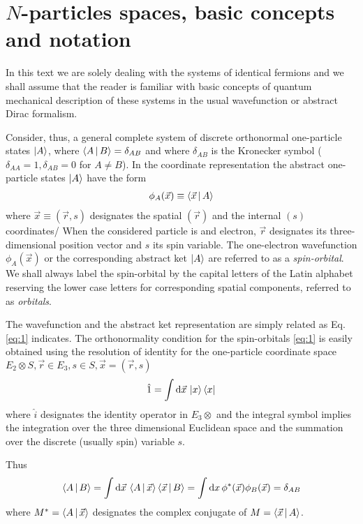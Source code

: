 \documentclass{book}
\renewcommand{\braket}[1]{\Braket{#1}}
\renewcommand{\ket}[1]{\Ket{#1}}
\renewcommand{\bra}[1]{\Bra{#1}}
\newcommand{\de}[1]{\mathrm{d}{#1}\,}
\begin{document}
\section{$N$-particles spaces, basic concepts and notation}
In this text we are solely dealing with the systems of identical fermions and we shall assume that the reader is familiar with basic concepts of quantum mechanical description of these systems in the usual wavefunction or abstract Dirac formalism.

Consider, thus, a general complete system of discrete orthonormal one-particle states $\ket{A}$, where $\braket{A|B}=\delta_{AB}$ and where $\delta_{AB}$ is the Kronecker symbol ($\delta_{AA}=1,\delta_{AB}=0$ for $A\neq B$). In the coordinate representation the abstract one-particle states $\ket{A}$ have the form 
\begin{align}
    \phi_A(\vec{x})\equiv \braket{\vec{x}|A}
    \label{eq:1}
\end{align} 
where $\vec{x}\equiv(\vec{r},s)$ designates the spatial $(\vec{r})$ and the internal $(s)$ coordinates/ When the considered particle is and electron, $\vec{r}$ designates its three-dimensional position vector and $s$ its spin variable. The one-electron wavefunction $\phi_A(\vec{x})$ or the corresponding abstract ket $\ket{A}$ are referred to as a \emph{spin-orbital}. We shall always label the spin-orbital by the capital letters of the Latin alphabet reserving the lower case letters for corresponding spatial components, referred to as \emph{orbitals}.

The wavefunction and the abstract ket representation are simply related as Eq. \eqref{eq:1} indicates. The orthonormality condition for the spin-orbitals \eqref{eq:1} is easily obtained using the resolution of identity for the one-particle coordinate space $E_2\otimes S, \vec{r}\in E_3, s\in S, \vec{x}=(\vec{r},s )$
\begin{align}
    \hat{1}=\int\de{\vec x}\ket{x}\bra{x}
    \label{eq:2}
\end{align}
where $\hat{i}$ designates the identity operator in $E_3\otimes$ and the integral symbol implies the integration over the three dimensional Euclidean space and the summation over the discrete (usually spin) variable $s$. 

Thus 
\begin{align}
    \braket{A|B}=\int\de{\vec{x}}\braket{A|\vec{x}}\braket{\vec{x}|B}=\int\de{x}\phi^*(\vec{x})\phi_B(\vec{x})=\delta_{AB}
\end{align}
where $M^*=\braket{A|\vec{x}}$ designates the complex conjugate of $M=\braket{\vec{x}|A}$.
\end{document}
